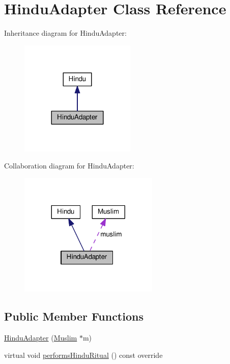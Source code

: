 \hypertarget{classHinduAdapter}{}\section{Hindu\+Adapter Class Reference}
\label{classHinduAdapter}


Inheritance diagram for Hindu\+Adapter\+:
\nopagebreak
\begin{figure}[H]
\begin{center}
\leavevmode
\includegraphics[width=156pt]{classHinduAdapter__inherit__graph}
\end{center}
\end{figure}


Collaboration diagram for Hindu\+Adapter\+:
\nopagebreak
\begin{figure}[H]
\begin{center}
\leavevmode
\includegraphics[width=188pt]{classHinduAdapter__coll__graph}
\end{center}
\end{figure}
\subsection*{Public Member Functions}
\begin{DoxyCompactItemize}
\item 
\hyperlink{classHinduAdapter_af378f4c2ad293836050be2b50821e781}{Hindu\+Adapter} (\hyperlink{classMuslim}{Muslim} $\ast$m)
\item 
virtual void \hyperlink{classHinduAdapter_a92390edb029c059347c8e3bdb825c5ce}{performs\+Hindu\+Ritual} () const override
\end{DoxyCompactItemize}
